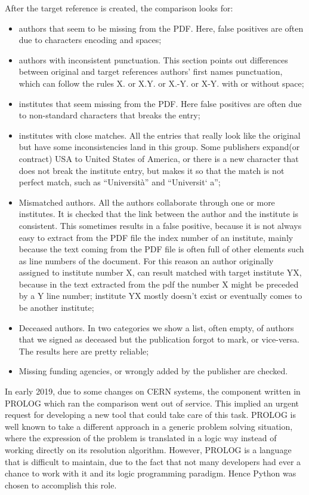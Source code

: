 After the target reference is created, the comparison looks for:
\begin{itemize}
\item authors that seem to be missing from the PDF. Here, false positives are often due to characters encoding and spaces;
\item authors with inconsistent punctuation. This section points out differences between original and target references authors’ first names punctuation,
which can follow the rules X. or X.Y. or X.-Y. or X-Y. with or without space;
\item institutes that seem missing from the PDF. Here false positives are often due to non-standard characters that breaks the entry;
\item institutes with close matches. All the entries that really look like the original but have some inconsistencies land in this group.
  Some publishers expand(or contract) USA to United States of America,
  or there is a new character that does not break the institute entry,
  but makes it so that the match is not perfect match, such as \enquote{Università} and \enquote{Universit` a};
\item Mismatched authors. All the authors collaborate through one or more institutes.
  It is checked that the link between the author and the institute is consistent.
  This sometimes results in a false positive,
  because it is not always easy to extract from the PDF file the index number of an institute,
  mainly because the text coming from the PDF file is often full of other elements such as line numbers of the document.
  For this reason an author originally assigned to institute number X, can result matched with target institute YX,
  because in the text extracted from the pdf the number X might be preceded by a Y line number;
  institute YX mostly doesn’t exist or eventually comes to be another institute;
\item Deceased authors. In two categories we show a list, often empty, of authors that we signed as deceased but the publication forgot to mark, or vice-versa.
  The results here are pretty reliable;
\item Missing funding agencies, or wrongly added by the publisher are checked.
\end{itemize}

In early 2019, due to some changes on CERN systems, the component written in PROLOG which ran the comparison went out of service.
This implied an urgent request for developing a new tool that could take care of this task.
PROLOG is well known to take a different approach in a generic problem solving situation,
where the expression of the problem is translated in a logic way instead of working directly on its resolution algorithm.
However, PROLOG is a language that is difficult to maintain,
due to the fact that not many developers had ever a chance to work with it and its logic programming paradigm.
Hence Python was chosen to accomplish this role.

